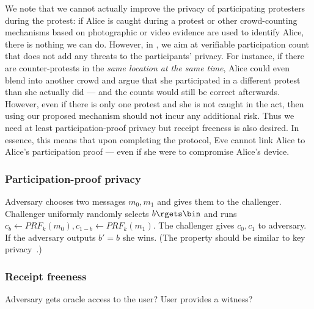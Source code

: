 We note that we cannot actually improve the privacy of participating protesters during the protest: if Alice is caught during a protest or other crowd-counting mechanisms based on photographic or video evidence are used to identify Alice, there is nothing we can do.
However, in \PRIVO, we aim at verifiable participation count that does not add any threats to the participants' privacy. 
For instance, if there are counter-protests in the \emph{same location at the same time}, Alice could even blend into another crowd and argue that she participated in a different protest than she actually did --- and the counts would still be correct afterwards.
However, even if there is only one protest and she is not caught in the act, then using our proposed mechanism should not incur any additional risk.
Thus we need at least participation-proof privacy but receipt freeness is also desired.
In essence, this means that upon completing the protocol, Eve cannot link Alice to Alice's participation proof --- even if she were to compromise Alice's device.

\subsubsection{Participation-proof privacy}

\begin{definition}
  Adversary chooses two messages \(m_0, m_1\) and gives them to the challenger.
  Challenger uniformly randomly selects \(b\rgets \bin\) and runs \(c_b \gets 
    PRF_k(m_0), c_{1-b} \gets PRF_k(m_1)\).
  The challenger gives \(c_0, c_1\) to adversary.
  If the adversary outputs \(b' = b\) she wins.
  (The property should be similar to key privacy~\cite{KeyPrivacy}.)
\end{definition}

\subsubsection{Receipt freeness}

\begin{definition}
  Adversary gets oracle access to the user?
  User provides a witness?
\end{definition}

